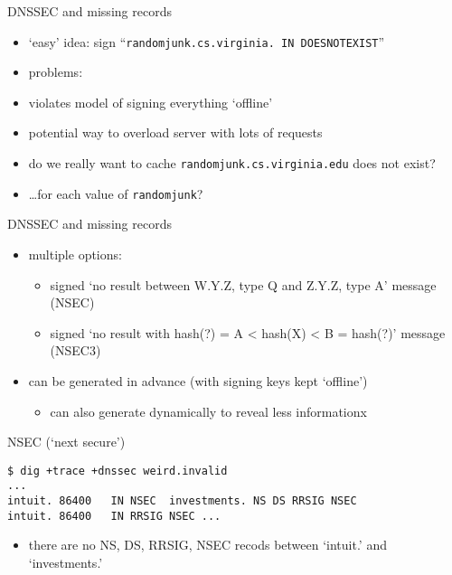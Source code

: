 
\begin{frame}{DNSSEC and missing records}
    \begin{itemize}
    \item `easy' idea: sign ``\texttt{randomjunk.cs.virginia. IN DOESNOTEXIST}''
    \vspace{.5cm}
    \item problems:
    \item violates model of signing everything `offline'
    \item potential way to overload server with lots of requests
    \item do we really want to cache \texttt{randomjunk.cs.virginia.edu} does not exist?
    \item \ldots for each value of \texttt{randomjunk}?
    \end{itemize}
\end{frame}

\begin{frame}{DNSSEC and missing records}
    \begin{itemize}
    \item multiple options:
        \begin{itemize}
        \item signed `no result between W.Y.Z, type Q and Z.Y.Z, type A' message (NSEC)
        \item signed `no result with hash(?) = A < hash(X) < B = hash(?)' message (NSEC3)
        \end{itemize}
    \item can be generated in advance  (with signing keys kept `offline')
        \begin{itemize}
        \item can also generate dynamically to reveal less informationx
        \end{itemize}
    \end{itemize}
\end{frame}

\begin{frame}[fragile]{NSEC (`next secure')}
\begin{Verbatim}[fontsize=\fontsize{9}{10}]
$ dig +trace +dnssec weird.invalid
...
intuit. 86400   IN NSEC  investments. NS DS RRSIG NSEC
intuit. 86400   IN RRSIG NSEC ...
\end{Verbatim}
\begin{itemize}
\item there are no NS, DS, RRSIG, NSEC recods between `intuit.' and `investments.'
\end{itemize}
\end{frame}

